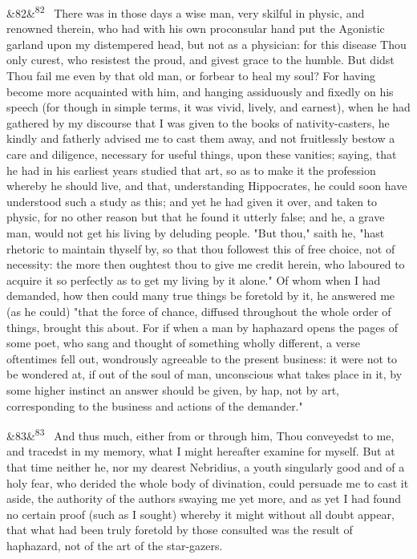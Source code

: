 \documentclass[12pt]{article}
\newcommand{\para}[1][]{\par\noindent\ifx&#1&\else\textsuperscript{\footnotesize #1}~\fi}
\begin{document}
\para[82] There was in those days a wise man, very skilful in physic, and renowned therein, who had with his own proconsular hand put the Agonistic garland upon my distempered head, but not as a physician: for this disease Thou only curest, who resistest the proud, and givest grace to the humble. But didst Thou fail me even by that old man, or forbear to heal my soul? For having become more acquainted with him, and hanging assiduously and fixedly on his speech (for though in simple terms, it was vivid, lively, and earnest), when he had gathered by my discourse that I was given to the books of nativity-casters, he kindly and fatherly advised me to cast them away, and not fruitlessly bestow a care and diligence, necessary for useful things, upon these vanities; saying, that he had in his earliest years studied that art, so as to make it the profession whereby he should live, and that, understanding Hippocrates, he could soon have understood such a study as this; and yet he had given it over, and taken to physic, for no other reason but that he found it utterly false; and he, a grave man, would not get his living by deluding people. "But thou," saith he, "hast rhetoric to maintain thyself by, so that thou followest this of free choice, not of necessity: the more then oughtest thou to give me credit herein, who laboured to acquire it so perfectly as to get my living by it alone." Of whom when I had demanded, how then could many true things be foretold by it, he answered me (as he could) "that the force of chance, diffused throughout the whole order of things, brought this about. For if when a man by haphazard opens the pages of some poet, who sang and thought of something wholly different, a verse oftentimes fell out, wondrously agreeable to the present business: it were not to be wondered at, if out of the soul of man, unconscious what takes place in it, by some higher instinct an answer should be given, by hap, not by art, corresponding to the business and actions of the demander."

\para[83] And thus much, either from or through him, Thou conveyedst to me, and tracedst in my memory, what I might hereafter examine for myself. But at that time neither he, nor my dearest Nebridius, a youth singularly good and of a holy fear, who derided the whole body of divination, could persuade me to cast it aside, the authority of the authors swaying me yet more, and as yet I had found no certain proof (such as I sought) whereby it might without all doubt appear, that what had been truly foretold by those consulted was the result of haphazard, not of the art of the star-gazers.
\end{document}
